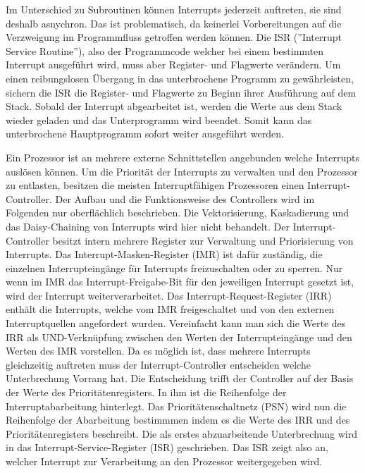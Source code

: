 \documentclass[a4paper,12pt]{article}
\begin{document}
\noindent Im Unterschied zu Subroutinen können Interrupts jederzeit auftreten, sie sind deshalb asnychron. Das ist problematisch, da keinerlei Vorbereitungen auf die Verzweigung im Programmfluss getroffen werden können. Die ISR (''Interrupt Service Routine''), also der Programmcode welcher bei einem bestimmten Interrupt ausgeführt wird, muss aber Register- und Flagwerte verändern. Um einen reibungslosen Übergang in das unterbrochene Programm zu gewährleisten, sichern die ISR die Register- und Flagwerte zu Beginn ihrer Ausführung auf dem Stack. Sobald der Interrupt abgearbeitet ist, werden die Werte aus dem Stack wieder geladen und das Unterprogramm wird beendet. Somit kann das unterbrochene Hauptprogramm sofort weiter ausgeführt werden.
 
\par\bigskip\noindent Ein Prozessor ist an mehrere externe Schnittstellen angebunden welche Interrupts auslösen können. Um die Priorität der Interrupts zu verwalten und den Prozessor zu entlasten, besitzen die meisten Interruptfähigen Prozessoren einen Interrupt-Controller. Der Aufbau und die Funktionsweise des Controllers wird im Folgenden nur oberflächlich beschrieben. Die Vektorisierung, Kaskadierung und das Daisy-Chaining von Interrupts wird hier nicht behandelt.
Der Interrupt-Controller besitzt intern mehrere Register zur Verwaltung und Priorisierung von Interrupts. Das Interrupt-Masken-Register (IMR) ist dafür zuständig, die einzelnen Interrupteingänge für Interrupts freizuschalten oder zu sperren. Nur wenn im IMR das Interrupt-Freigabe-Bit für den jeweiligen Interrupt gesetzt ist, wird der Interrupt weiterverarbeitet. Das Interrupt-Request-Register (IRR) enthält die Interrupts, welche vom IMR freigeschaltet  und von den externen Interruptquellen angefordert wurden. Vereinfacht kann man sich die Werte des IRR als UND-Verknüpfung zwischen den Werten der Interrupteingänge und den Werten des IMR vorstellen. Da es möglich ist, dass mehrere Interrupts gleichzeitig auftreten muss der Interrupt-Controller entscheiden welche Unterbrechung Vorrang hat. Die Entscheidung trifft der Controller auf der Basis der Werte des Prioritätenregisters. In ihm ist die Reihenfolge der Interruptabarbeitung hinterlegt. Das Prioritätenschaltnetz (PSN) wird nun die Reihenfolge der Abarbeitung bestimmmen indem es die Werte des IRR und des Prioritätenregisters beschreibt. Die als erstes abzuarbeitende Unterbrechung wird in das Interrupt-Service-Register (ISR) geschrieben. Das ISR zeigt also an, welcher Interrupt zur Verarbeitung an den Prozessor weitergegeben wird. \cite[S.114ff]{mikroprozessortechnik2011}
\end{document}
